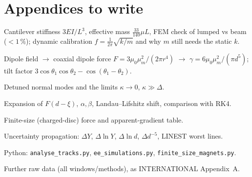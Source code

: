 \documentclass[11pt,a4paper]{article}
\newcommand{\Y}{Y}                       %
\newcommand{\muz}{\mu_0}
\newcommand{\mum}{\mu_m}
\begin{document}
\clearpage
\section{Appendices to write}\label{sec:app}
\begin{description}[leftmargin=1.2cm,style=nextline]
\item[A] Cantilever stiffness $3EI/L^3$, effective mass $\tfrac{33}{140}\mu L$, FEM check of
lumped vs beam ($<1\,\%$); dynamic calibration $f=\tfrac1{2\pi}\sqrt{k/m}$ and why $m$ still
needs the static $k$.
\item[B] Dipole field $\to$ coaxial dipole force $F=3\muz\mum^2/(2\pi r^4)$ $\to$
$\gamma=6\muz\mum^2/(\pi d^5)$; tilt factor $3\cos\theta_1\cos\theta_2-\cos(\theta_1-\theta_2)$.
\item[C] Detuned normal modes and the limits $\kappa\to0$, $\kappa\gg\Delta$.
\item[D] Expansion of $F(d-\xi)$, $\alpha,\beta$, Landau--Lifshitz shift, comparison with RK4.
\item[E] Finite-size (charged-disc) force and apparent-gradient table.
\item[F] Uncertainty propagation: $\Delta\Y$, $\Delta\ln\Y$, $\Delta\ln d$, $\Delta d^{-5}$,
LINEST worst lines.
\item[G] Python: \texttt{analyse\_tracks.py}, \texttt{ee\_simulations.py},
\texttt{finite\_size\_magnets.py}.
\item[H] Further raw data (all windows/methods), as INTERNATIONAL Appendix~A.
\end{description}

\end{document}
